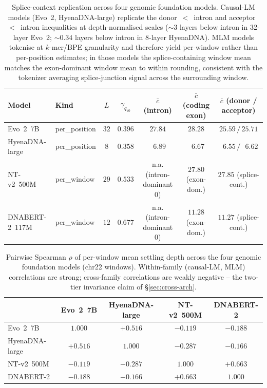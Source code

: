 \documentclass{article}
\theoremstyle{plain}
\theoremstyle{definition}
\theoremstyle{remark}
\begin{document}
\begin{table}[h]
\caption{Splice-context replication across four genomic foundation
models. Causal-LM models (Evo~2, HyenaDNA-large) replicate the
donor~$<$~intron and acceptor~$<$~intron inequalities at
depth-normalised scales ($\sim 3$ layers below intron in 32-layer
Evo~2; $\sim 0.34$ layers below intron in 8-layer HyenaDNA). MLM
models tokenise at $k$-mer/BPE granularity and therefore yield
per-window rather than per-position estimates; in those models the
splice-containing window mean matches the exon-dominant window mean to
within rounding, consistent with the tokenizer averaging splice-junction
signal across the surrounding window.}
\label{tab:cross-arch-context}
\centering
\footnotesize
\setlength{\tabcolsep}{4pt}
\begin{tabular}{@{}llccccc@{}}
\toprule
Model & Kind & $L$ & $\gamma_{q_{70}}$
   & $\bar c$ (intron) & $\bar c$ (coding exon)
   & $\bar c$ (donor / acceptor) \\
\midrule
Evo~2~7B            & per\_position & $32$ & $0.396$
   & $27.84$ & $28.28$ & $25.59 \,/\, 25.71$ \\
HyenaDNA-large      & per\_position & $8$  & $0.358$
   & $\phantom{0}6.89$ & $\phantom{0}6.67$
   & $\phantom{0}6.55 \,/\, \phantom{0}6.62$ \\
NT-v2~500M          & per\_window   & $29$ & $0.533$
   & n.a. (intron-dominant 0)
   & $27.80$ (exon-dom.) & $27.85$ (splice-cont.) \\
DNABERT-2~117M      & per\_window   & $12$ & $0.677$
   & n.a. (intron-dominant 0)
   & $11.28$ (exon-dom.) & $11.27$ (splice-cont.) \\
\bottomrule
\end{tabular}
\end{table}

\begin{table}[h]
\caption{Pairwise Spearman $\rho$ of per-window mean settling depth
across the four genomic foundation models (chr22 windows). Within-family
(causal-LM, MLM) correlations are strong; cross-family correlations are
weakly negative -- the two-tier invariance claim of \S\ref{sec:cross-arch}.}
\label{tab:cross-arch-rho}
\centering
\footnotesize
\setlength{\tabcolsep}{4pt}
\begin{tabular}{@{}lcccc@{}}
\toprule
 & Evo~2~7B & HyenaDNA-large & NT-v2~500M & DNABERT-2 \\
\midrule
Evo~2~7B         & $1.000$  & $+0.516$ & $-0.119$ & $-0.188$ \\
HyenaDNA-large   & $+0.516$ & $1.000$  & $-0.287$ & $-0.166$ \\
NT-v2~500M       & $-0.119$ & $-0.287$ & $1.000$  & $+0.663$ \\
DNABERT-2        & $-0.188$ & $-0.166$ & $+0.663$ & $1.000$  \\
\bottomrule
\end{tabular}
\end{table}
\end{document}
